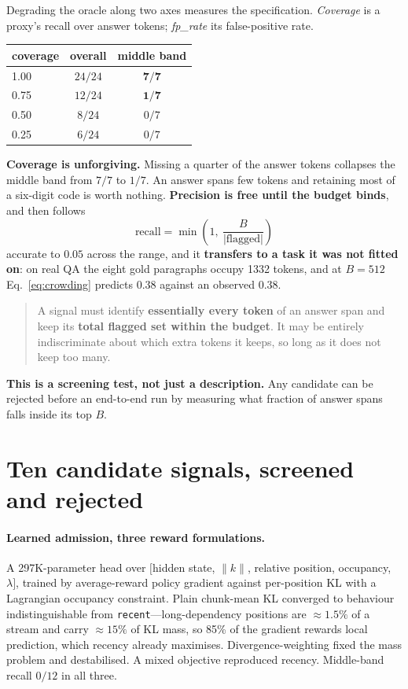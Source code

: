 \documentclass[10pt]{article}
\begin{document}
Degrading the oracle along two axes measures the specification. \emph{Coverage}
is a proxy's recall over answer tokens; \emph{fp\_rate} its false-positive rate.

\begin{table}[h]\centering\small
\begin{tabular}{lcc}
\toprule
coverage & overall & middle band \\
\midrule
1.00 & $24/24$ & $\mathbf{7/7}$ \\
0.75 & $12/24$ & $\mathbf{1/7}$ \\
0.50 & $8/24$  & $0/7$ \\
0.25 & $6/24$  & $0/7$ \\
\bottomrule
\end{tabular}
\end{table}

\textbf{Coverage is unforgiving.} Missing a quarter of the answer tokens
collapses the middle band from $7/7$ to $1/7$. An answer spans few tokens and
retaining most of a six-digit code is worth nothing.
\textbf{Precision is free until the budget binds}, and then follows
\begin{equation}
  \text{recall} = \min\!\left(1,\ \frac{B}{|\text{flagged}|}\right)
  \label{eq:crowding}
\end{equation}
accurate to $0.05$ across the range, and it \textbf{transfers to a task it was
not fitted on}: on real QA the eight gold paragraphs occupy 1332 tokens, and at
$B{=}512$ Eq.~\ref{eq:crowding} predicts $0.38$ against an observed $0.38$.

\begin{quote}
A signal must identify \textbf{essentially every token} of an answer span and
keep its \textbf{total flagged set within the budget}. It may be entirely
indiscriminate about which extra tokens it keeps, so long as it does not keep
too many.
\end{quote}

\textbf{This is a screening test, not just a description.} Any candidate can be
rejected before an end-to-end run by measuring what fraction of answer spans
falls inside its top $B$.

\section{Ten candidate signals, screened and rejected}\label{sec:screen}

\paragraph{Learned admission, three reward formulations.} A 297K-parameter head
over $[$hidden state, $\|k\|$, relative position, occupancy, $\lambda]$, trained
by average-reward policy gradient against per-position KL with a Lagrangian
occupancy constraint. Plain chunk-mean KL converged to behaviour
indistinguishable from \texttt{recent}---long-dependency positions are
${\approx}1.5\%$ of a stream and carry ${\approx}15\%$ of KL mass, so 85\% of
the gradient rewards local prediction, which recency already maximises.
Divergence-weighting fixed the mass problem and destabilised. A mixed objective
reproduced recency. Middle-band recall $0/12$ in all three.
\end{document}
